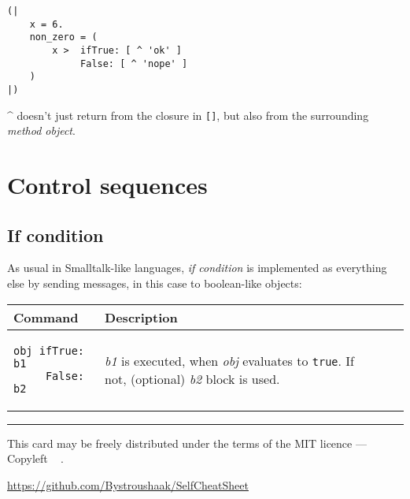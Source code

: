\documentclass[10pt]{article}
\begin{document}
\begin{multicols*}{3}
\begin{lstlisting}
(|
    x = 6.
    non_zero = (
        x >  ifTrue: [ ^ 'ok' ]
             False: [ ^ 'nope' ]
    )
|)
\end{lstlisting}

\^{} doesn't just return from the closure in \texttt{[]}, but also from the surrounding \textit{method object}.




\pagebreak
\section{Control sequences}
\subsection{If condition}

As usual in Smalltalk-like languages, \textit{if condition} is implemented as everything else by sending messages, in this case to boolean-like objects:

\vspace*{0.2cm}
\begin{tabular}{ p{70pt} p{140pt} l l }
Command & Description \\ \hline
\begin{lstlisting}
obj ifTrue: b1
     False: b2
\end{lstlisting}
&\vspace*{0.1cm} \textit{b1} is executed, when \textit{obj} evaluates to \texttt{true}.
If not, (optional) \textit{b2} block is used. \\
\hline


\end{tabular}





\vfill \hrule\smallskip
{\small This card may be freely distributed under
the terms of the MIT licence ---
Copyleft \textcopyleft\ \thedate{} \href{http://kitakitsune.org}{\theauthor}.

\url{https://github.com/Bystroushaak/SelfCheatSheet}
}

\end{multicols*}
\end{document}
